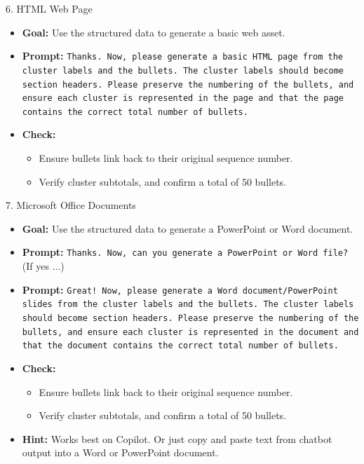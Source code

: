 \documentclass[aspectratio=169]{beamer}
\begin{document}
\begin{frame}{6. HTML Web Page}
\begin{itemize}
  \item \textbf{Goal:} Use the structured data to generate a basic web asset.
  \item \textbf{Prompt:} \texttt{Thanks. Now, please generate a basic HTML page from the cluster labels and the bullets. The cluster labels should become section headers. Please preserve the numbering of the bullets, and ensure each cluster is represented in the page and that the page contains the correct total number of bullets.}
  \item \textbf{Check:}
    \begin{itemize}
      \item Ensure bullets link back to their original sequence number.
      \item Verify cluster subtotals, and confirm a total of 50 bullets.
    \end{itemize}
\end{itemize}
\end{frame}

\begin{frame}{7. Microsoft Office Documents}
\begin{itemize}
  \item \textbf{Goal:} Use the structured data to generate a PowerPoint or Word document.
  \item \textbf{Prompt:} \texttt{Thanks. Now, can you generate a PowerPoint or Word file?} (If yes ...)
  \item \textbf{Prompt:} \texttt{Great! Now, please generate a Word document/PowerPoint slides from the cluster labels and the bullets. The cluster labels should become section headers. Please preserve the numbering of the bullets, and ensure each cluster is represented in the document and that the document contains the correct total number of bullets.} 
  \item \textbf{Check:}
    \begin{itemize}
      \item Ensure bullets link back to their original sequence number.
      \item Verify cluster subtotals, and confirm a total of 50 bullets.
    \end{itemize}
  \item \textbf{Hint:} Works best on Copilot. Or just copy and paste text from chatbot output into a Word or PowerPoint document.
\end{itemize}
\end{frame}
\end{document}
